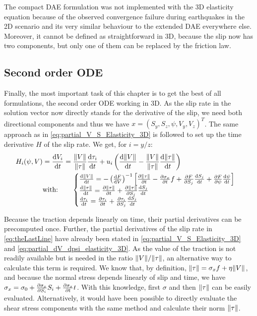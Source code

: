 The compact DAE formulation was not implemented with the 3D elasticity equation because of the observed convergence failure during earthquakes in the 2D scenario and its very similar behaviour to the extended DAE everywhere else. Moreover, it cannot be defined as straightforward in 3D, because the slip now has two components, but only one of them can be replaced by the friction law. 

\subsection{Second order ODE}
Finally, the most important task of this chapter is to get the best of all formulations, the second order ODE working in 3D. As the slip rate in the solution vector now directly stands for the derivative of the slip, we need both directional components and thus we have $x = (S_y, S_z, \psi, V_y, V_z)^T$. The same approach as in \autoref{eq:partial_V_S_Elasticity_3D} is followed to set up the time derivative $H$ of the slip rate. We get, for $i=y/z$:
\begin{align}
	H_i(\psi,V) &= \dv{V_i}{t} = \frac{\norm{V}}{\norm{\tau}}\dv{\tau_i}{t} + u_i\left(\dv{\norm{V}}{t} - \frac{\norm{V}}{\norm{\tau}}\dv{\norm{\tau}}{t}\right) \\
	&\text{with:}\qquad\begin{cases}
		\dv{\norm{V}}{t} = -\left(\dv{F}{V}\right)^{-1}\left[\pdv{\norm{\tau}}{t} - \pdv{\sigma_x}{t}f + \pdv{F}{S_j}\dv{S_j}{t} + \pdv{F}{\psi}\dv{\psi}{t} \right] \\
		\dv{\norm{\tau}}{t} = \pdv{\norm{\tau}}{t} + \pdv{\norm{\tau}}{S_j}\dv{S_j}{t} \\
		\dv{\tau_i}{t} = \pdv{\tau_i}{t} + \pdv{\tau_i}{S_j}\dv{S_j}{t}
	\end{cases}
\end{align}

Because the traction depends linearly on time, their partial derivatives can be precomputed once. Further, the partial derivatives of the slip rate in \autoref{eq:theLastLine} have already been stated in \autoref{eq:partial_V_S_Elasticity_3D} and \autoref{eq:partial_dV_dpsi_elasticity_3D}. As the value of the traction is not readily available but is needed in the ratio $\norm{V}/\norm{\tau}$, an alternative way to calculate this term is required. We know that, by definition, $\norm{\tau} = \sigma_x f + \eta\norm{V}$, and because the normal stress depends linearly of slip and time, we have $\sigma_x = \sigma_0 + \pdv{\sigma_x}{S_i}S_i + \pdv{\sigma_x}{t}t$. With this knowledge, first $\sigma$ and then $\norm{\tau}$ can be easily evaluated. Alternatively, it would have been possible to directly evaluate the shear stress components with the same method and calculate their norm $\norm{\tau}$. 

